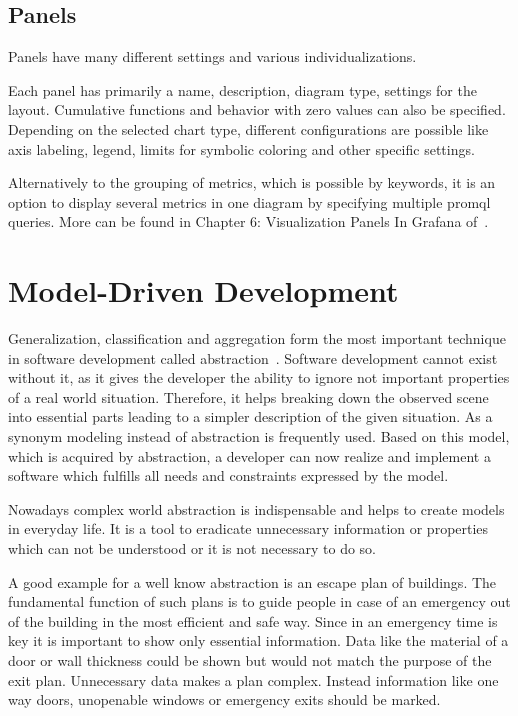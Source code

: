 \subsection{Panels}

Panels have many different settings and various individualizations. 

Each panel has primarily a name, description, diagram type, settings for the layout. Cumulative functions and behavior with zero values can also be specified. Depending on the selected chart type, different configurations are possible like axis labeling, legend, limits for symbolic coloring and other specific settings.

Alternatively to the grouping of metrics, which is possible by keywords, it is an option to display several metrics in one diagram by specifying multiple \gls{promql} queries. More can be found in  Chapter 6: Visualization Panels In Grafana of~\cite{Salituro2020}.

\section{Model-Driven Development}

Generalization, classification and aggregation form the most important technique in software development called abstraction~\cite{Brambilla_2017}. Software development cannot exist without it, as it gives the developer the ability to ignore not important properties of a real world situation. Therefore, it helps breaking down the observed scene into essential parts leading to a simpler description of the given situation. As a synonym modeling instead of abstraction is frequently used. Based on this model, which is acquired by abstraction, a developer can now realize and implement a software which fulfills all needs and constraints expressed by the model. 

Nowadays complex world abstraction is indispensable and helps to create models in everyday life. It is a tool to eradicate unnecessary information or properties which can not be understood or it is not necessary to do so. 

A good example for a well know abstraction is an escape plan of buildings. The fundamental function of such plans is to guide people in case of an emergency out of the building in the most efficient and safe way. Since in an emergency time is key it is important to show only essential information. Data like the material of a door or wall thickness could be shown but would not match the purpose of the exit plan. Unnecessary data makes a plan complex. Instead information like one way doors, unopenable windows or emergency exits should be marked. 

